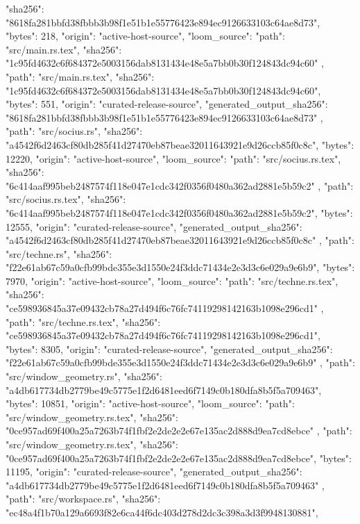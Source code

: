 {{      "sha256": "8618fa281bbfd38fbbb3b98f1e51b1e55776423e894ec9126633103c64ae8d73",
      "bytes": 218,
      "origin": "active-host-source",
      "loom_source": {
        "path": "src/main.rs.tex",
        "sha256": "1c95fd4632c6f684372e5003156dab8131434e48e5a7bb0b30f124843dc94c60"
      }
    },
    {
      "path": "src/main.rs.tex",
      "sha256": "1c95fd4632c6f684372e5003156dab8131434e48e5a7bb0b30f124843dc94c60",
      "bytes": 551,
      "origin": "curated-release-source",
      "generated_output_sha256": "8618fa281bbfd38fbbb3b98f1e51b1e55776423e894ec9126633103c64ae8d73"
    },
    {
      "path": "src/socius.rs",
      "sha256": "a4542f6d2463cf80db285f41d27470eb87beae32011643921e9d26ccb85f0c8c",
      "bytes": 12220,
      "origin": "active-host-source",
      "loom_source": {
        "path": "src/socius.rs.tex",
        "sha256": "6c414aaf995beb2487574f118e047e1cdc342f0356f0480a362ad2881e5b59c2"
      }
    },
    {
      "path": "src/socius.rs.tex",
      "sha256": "6c414aaf995beb2487574f118e047e1cdc342f0356f0480a362ad2881e5b59c2",
      "bytes": 12555,
      "origin": "curated-release-source",
      "generated_output_sha256": "a4542f6d2463cf80db285f41d27470eb87beae32011643921e9d26ccb85f0c8c"
    },
    {
      "path": "src/techne.rs",
      "sha256": "f22e61ab67c59a0cfb99bde355e3d1550e24f3ddc71434e2e3d3c6e029a9e6b9",
      "bytes": 7970,
      "origin": "active-host-source",
      "loom_source": {
        "path": "src/techne.rs.tex",
        "sha256": "ce598936845a37e09432cb78a27d494f6c76fc74119298142163b1098e296cd1"
      }
    },
    {
      "path": "src/techne.rs.tex",
      "sha256": "ce598936845a37e09432cb78a27d494f6c76fc74119298142163b1098e296cd1",
      "bytes": 8305,
      "origin": "curated-release-source",
      "generated_output_sha256": "f22e61ab67c59a0cfb99bde355e3d1550e24f3ddc71434e2e3d3c6e029a9e6b9"
    },
    {
      "path": "src/window_geometry.rs",
      "sha256": "a4db617734db2779be49c5775e1f2d6481eed6f7149c0b180dfa8b5f5a709463",
      "bytes": 10851,
      "origin": "active-host-source",
      "loom_source": {
        "path": "src/window_geometry.rs.tex",
        "sha256": "0ce957ad69f400a25a7263b74f1fbf2e2de2e2e67e135ac2d888d9ea7cd8ebce"
      }
    },
    {
      "path": "src/window_geometry.rs.tex",
      "sha256": "0ce957ad69f400a25a7263b74f1fbf2e2de2e2e67e135ac2d888d9ea7cd8ebce",
      "bytes": 11195,
      "origin": "curated-release-source",
      "generated_output_sha256": "a4db617734db2779be49c5775e1f2d6481eed6f7149c0b180dfa8b5f5a709463"
    },
    {
      "path": "src/workspace.rs",
      "sha256": "ec48a4f1b70a129a6693f82e6ca44f6dc403d278d2dc3c398a3d3f9948130881",
}}
